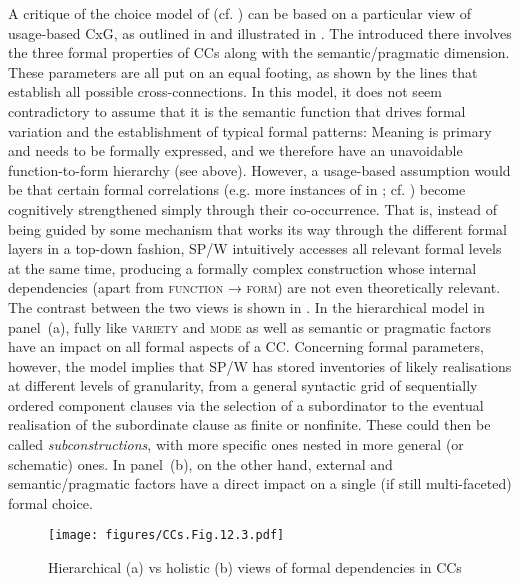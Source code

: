 A critique of the choice model of  (cf. ) can be based on  a particular view of usage-based CxG, as outlined in  and illustrated in . The  introduced there involves the three formal properties of CCs along with the semantic/pragmatic dimension. These parameters are all put on an equal footing, as shown by the lines that establish all possible cross-connections. In this model, it does not seem contradictory to assume that it is the semantic function that drives formal variation and the establishment of typical formal patterns: Meaning is primary and needs to be formally expressed, and we therefore have an unavoidable function-to-form hierarchy (see  above). However, a usage-based assumption would be that certain formal correlations (e.g. more instances of  in ; cf. ) become cognitively strengthened simply through their co-occurrence. That is, instead of being guided by some mechanism that works its way through the different formal layers in a top-down fashion, SP/W intuitively accesses all relevant formal levels at the same time, producing a formally complex construction whose internal dependencies (apart from \textsc{function} → \textsc{form}) are not even theoretically relevant. The contrast between the two views is shown in . In the hierarchical model in panel~(a), fully  like \textsc{variety} and \textsc{mode} as well as semantic or pragmatic factors have an impact on all formal aspects of a CC. Concerning formal parameters, however, the model implies that SP/W has stored inventories of likely realisations at different levels of granularity, from a general syntactic grid of sequentially ordered component clauses via the selection of a subordinator to the eventual realisation of the subordinate clause as finite or nonfinite. These could then be called \textit{subconstructions}, with more specific ones nested in more general (or schematic) ones. In panel~(b), on the other hand, external and semantic/pragmatic factors have a direct impact on a single (if still multi-faceted) formal choice.

\begin{figure}
\texttt{[image: figures/CCs.Fig.12.3.pdf]}
\caption{\label{bkm:Ref81509266}\label{fig:12.3}Hierarchical (a) vs holistic (b) views of formal dependencies in CCs}
 \end{figure}

